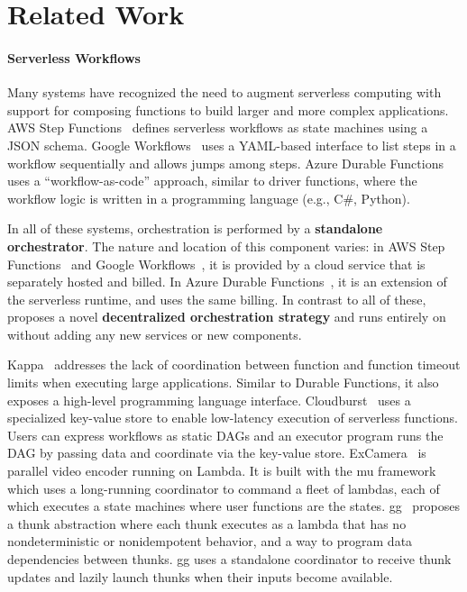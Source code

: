 \section{Related Work}\label{sec:related}

\paragraph{Serverless Workflows}

Many systems have recognized the need to augment serverless computing with
support for composing functions to build larger and more complex applications.
AWS Step Functions~\cite{aws-step-functions} defines serverless workflows as
state machines using a JSON schema. Google Workflows~\cite{google-workflows}
uses a YAML-based interface to list steps in a workflow sequentially and
allows jumps among steps. Azure Durable Functions~\cite{durable-functions}
uses a ``workflow-as-code'' approach, similar to driver functions, where the
workflow logic is written in a programming language (e.g., C\#, Python).


In all of these systems, orchestration is performed by a \textbf
{standalone orchestrator}. The nature and location of this component varies:
in AWS Step Functions~\cite{aws-step-functions} and Google Workflows~\cite
{google-workflows}, it is provided by a cloud service that is separately
hosted and billed. In Azure Durable Functions~\cite{durable-functions}, it is
an extension of the serverless runtime, and uses the same billing. In
contrast to all of these,
 \name{} proposes a novel \textbf{decentralized orchestration strategy} and
runs entirely on  without
adding any new services or new components.


Kappa~\cite{kappa} addresses the lack of coordination between function and
function timeout limits when executing large applications. Similar to Durable
Functions, it also exposes a high-level programming language interface.
Cloudburst~\cite{cloudburst} uses a specialized key-value store to enable
low-latency execution of serverless functions. Users can express workflows as
static DAGs and an executor program runs the DAG by passing data and
coordinate via the key-value store. ExCamera~\cite{excamera} is parallel video
encoder running on Lambda. It is built with the mu framework which uses a
long-running coordinator to command a fleet of lambdas, each of which executes
a state machines where user functions are the states. gg~\cite{gg-atc}
proposes a thunk abstraction where each thunk executes as a lambda that has no
nondeterministic or nonidempotent behavior, and a way to program data
dependencies between thunks. gg uses a standalone coordinator to receive thunk
updates and lazily launch thunks when their inputs become available.

